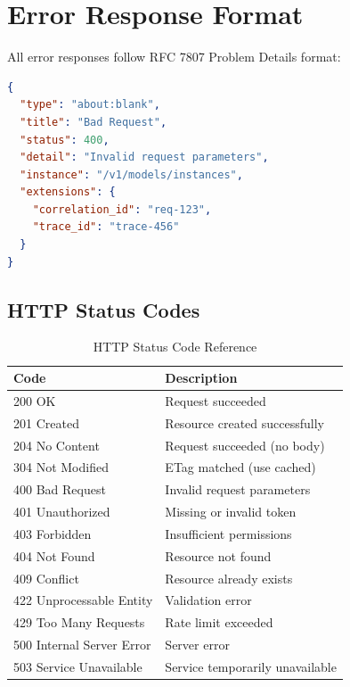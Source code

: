 \documentclass[a4paper,twoside]{sapthesis}
\begin{document}
\section{Error Response Format}
\label{app:api:errors}

All error responses follow RFC 7807 Problem Details format:

\begin{lstlisting}[language=json]
{
  "type": "about:blank",
  "title": "Bad Request",
  "status": 400,
  "detail": "Invalid request parameters",
  "instance": "/v1/models/instances",
  "extensions": {
    "correlation_id": "req-123",
    "trace_id": "trace-456"
  }
}
\end{lstlisting}

\subsection{HTTP Status Codes}

\begin{table}[ht]
\centering
\caption{HTTP Status Code Reference}
\label{tab:http-status-codes}
\small
\begin{tabularx}{\textwidth}{lX}
    \hline
    \textbf{Code} & \textbf{Description} \\
    \hline
    200 OK & Request succeeded \\
    201 Created & Resource created successfully \\
    204 No Content & Request succeeded (no body) \\
    304 Not Modified & ETag matched (use cached) \\
    400 Bad Request & Invalid request parameters \\
    401 Unauthorized & Missing or invalid token \\
    403 Forbidden & Insufficient permissions \\
    404 Not Found & Resource not found \\
    409 Conflict & Resource already exists \\
    422 Unprocessable Entity & Validation error \\
    429 Too Many Requests & Rate limit exceeded \\
    500 Internal Server Error & Server error \\
    503 Service Unavailable & Service temporarily unavailable \\
    \hline
\end{tabularx}
\end{table}
\end{document}
